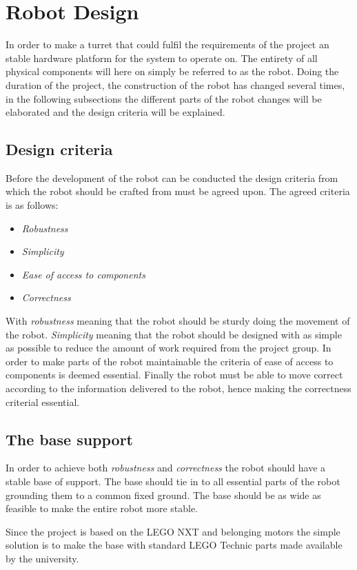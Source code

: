 \section{Robot Design}\label{Design:Robot}
In order to make a turret that could fulfil the requirements of the project an stable hardware platform for the system to operate on. 
The entirety of all physical components will here on simply be referred to as the robot.
Doing the duration of the project, the construction of the robot has changed several times, in the following subsections the different parts of the robot changes will be elaborated and the design criteria will be explained. 

\subsection{Design criteria}
Before the development of the robot can be conducted the design criteria from which the robot should be crafted from must be agreed upon. 
The agreed criteria is as follows:
\begin{itemize}
\item \textit{Robustness}
\item \textit{Simplicity}
\item \textit{Ease of access to components}
\item \textit{Correctness}
\end{itemize}

With \textit{robustness} meaning that the robot should be sturdy doing the movement of the robot.
\textit{Simplicity} meaning that the robot should be designed with as simple as possible to reduce the amount of work required from the project group. 
In order to make parts of the robot maintainable the criteria of ease of access to components is deemed essential. 
Finally the robot must be able to move correct according to the information delivered to the robot, hence making the correctness criterial essential. 

\subsection{The base support}
In order to achieve both \textit{robustness} and \textit{correctness} the robot should have a stable base of support. 
The base should tie in to all essential parts of the robot grounding them to a common fixed ground.
The base should be as wide as feasible to make the entire robot more stable. 

Since the project is based on the LEGO NXT and belonging motors the simple solution is to make the base with standard LEGO Technic parts made available by the university. 

